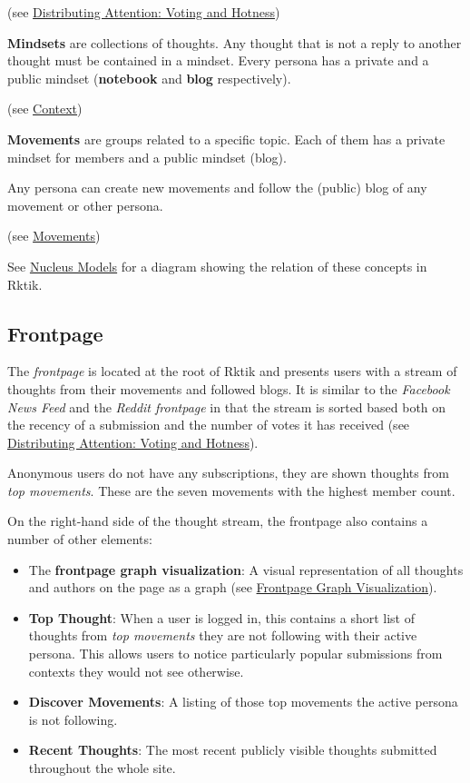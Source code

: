 (see \hyperref[hotness]{Distributing Attention: Voting and Hotness})

\textbf{Mindsets} are collections of thoughts. Any thought that is not a
reply to another thought must be contained in a mindset. Every persona
has a private and a public mindset (\textbf{notebook} and \textbf{blog}
respectively).

(see \hyperref[context]{Context})

\textbf{Movements} are groups related to a specific topic. Each of them
has a private mindset for members and a public mindset (blog).

Any persona can create new movements and follow the (public) blog of any
movement or other persona.

(see \hyperref[movements]{Movements})

See \hyperref[nucleus-models]{Nucleus Models} for a diagram showing the
relation of these concepts in Rktik.

\subsection{Frontpage}\label{frontpage}

The \emph{frontpage} is located at the root of Rktik and presents users
with a stream of thoughts from their movements and followed blogs. It is
similar to the \emph{Facebook News Feed} and the \emph{Reddit frontpage}
in that the stream is sorted based both on the recency of a submission
and the number of votes it has received (see
\hyperref[hotness]{Distributing Attention: Voting and Hotness}).

Anonymous users do not have any subscriptions, they are shown thoughts
from \emph{top movements}. These are the seven movements with the
highest member count.

On the right-hand side of the thought stream, the frontpage also
contains a number of other elements:

\begin{itemize}
\tightlist
\item
  The \textbf{frontpage graph visualization}: A visual representation of
  all thoughts and authors on the page as a graph (see
  \href{img/graph.png}{Frontpage Graph Visualization}).
\item
  \textbf{Top Thought}: When a user is logged in, this contains a short
  list of thoughts from \emph{top movements} they are not following with
  their active persona. This allows users to notice particularly popular
  submissions from contexts they would not see otherwise.
\item
  \textbf{Discover Movements}: A listing of those top movements the
  active persona is not following.
\item
  \textbf{Recent Thoughts}: The most recent publicly visible thoughts
  submitted throughout the whole site.
\end{itemize}

